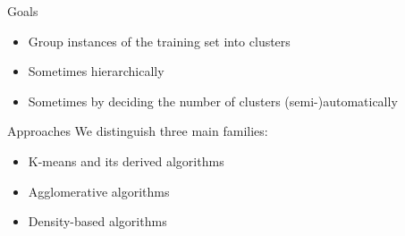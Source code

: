 \begin{frame}{Goals}
  \begin{itemize}
    \item Group instances of the training set into clusters
    \item Sometimes hierarchically
    \item Sometimes by deciding the number of clusters (semi-)automatically
  \end{itemize}
\end{frame}

\begin{frame}{Approaches}
  We distinguish three main families:

  \begin{itemize}
    \item K-means and its derived algorithms
    \item Agglomerative algorithms
    \item Density-based algorithms
  \end{itemize}
\end{frame}